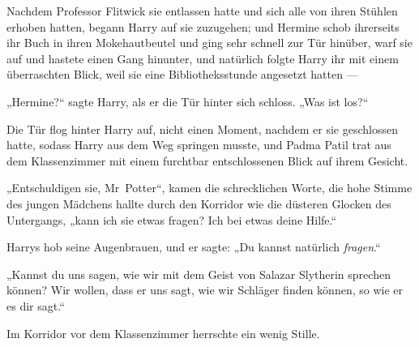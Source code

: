Nachdem Professor Flitwick sie entlassen hatte und sich alle von ihren Stühlen erhoben hatten, begann Harry auf sie zuzugehen; und Hermine schob ihrerseits ihr Buch in ihren Mokehautbeutel und ging sehr schnell zur Tür hinüber, warf sie auf und hastete einen Gang hinunter, und natürlich folgte Harry ihr mit einem überraschten Blick, weil sie eine Bibliotheksstunde angesetzt hatten —

„Hermine?“ sagte Harry, als er die Tür hinter sich schloss.
„Was ist los?“

Die Tür flog hinter Harry auf, nicht einen Moment, nachdem er sie geschlossen hatte, sodass Harry aus dem Weg springen musste, und Padma Patil trat aus dem Klassenzimmer mit einem furchtbar entschlossenen Blick auf ihrem Gesicht.

„Entschuldigen sie, Mr~Potter“, kamen die schrecklichen Worte, die hohe Stimme des jungen Mädchens hallte durch den Korridor wie die düsteren Glocken des Untergangs, „kann ich sie etwas fragen? Ich bei etwas deine Hilfe.“

Harrys hob seine Augenbrauen, und er sagte:
„Du kannst natürlich \emph{fragen}.“

„Kannst du uns sagen, wie wir mit dem Geist von Salazar Slytherin sprechen können? Wir wollen, dass er uns sagt, wie wir Schläger finden können, so wie er es dir sagt.“

Im Korridor vor dem Klassenzimmer herrschte ein wenig Stille.


